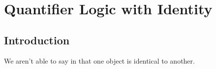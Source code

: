 \section{Quantifier Logic with Identity}\label{Sec:Quantifier Logic with Identity}

\subsection{Introduction}
We aren't able to say in \GQL{} that one object is identical to another. 

